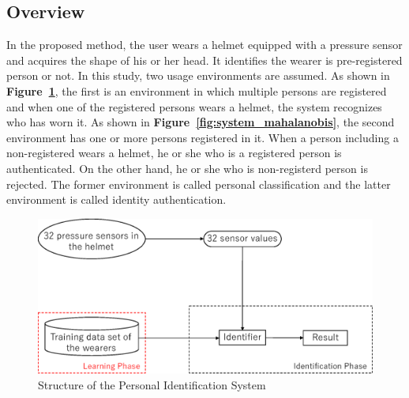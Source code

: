 \documentclass[sigchi,authordraft]{acmart}
\newcommand\figref[1]{\textbf{Figure~\ref{fig:#1}}}
\begin{document}

\subsection{Overview}
In the proposed method, the user wears a helmet equipped with a pressure sensor and acquires the shape of his or her head. It identifies the wearer is pre-registered person or not. In this study, two usage environments are assumed. As shown in \figref{system_classification}, the first is an environment in which multiple persons are registered and when one of the registered persons wears a helmet, the system recognizes who has worn it. As shown in \figref{system_mahalanobis}, the second environment has one or more persons registered in it. When a person including a non-registered wears a helmet, he or she who is a registered person is authenticated. On the other hand, he or she who is non-registerd person is rejected. The former environment is called personal classification and the latter environment is called identity authentication.


\begin{figure}[!t]
  \centering
    \includegraphics[width=1\linewidth]{figure/system_classification.eps}
  \caption{Structure of the Personal Identification System}
  \label{fig:system_classification}
\end{figure}
\end{document}
